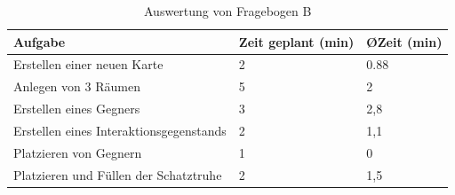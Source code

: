 \begin{table}

\begin{tabularx}{\textwidth}{|X|l|l|}
\hline
Aufgabe & Zeit geplant (min) & \O Zeit (min)\\
\hline
\hline
Erstellen einer neuen Karte & 2 & 0.88 \\
\hline
Anlegen von 3 Räumen & 5 & 2 \\
\hline
Erstellen eines Gegners & 3 & 2,8 \\
\hline
Erstellen eines Interaktionsgegenstands & 2 & 1,1 \\
\hline
Platzieren von Gegnern & 1 & 0 \\
\hline
Platzieren und Füllen der Schatztruhe & 2 & 1,5 \\

\hline
\end{tabularx}
\caption{Auswertung von Fragebogen B}
	\label{tab:FragebogenB}
\end{table}






